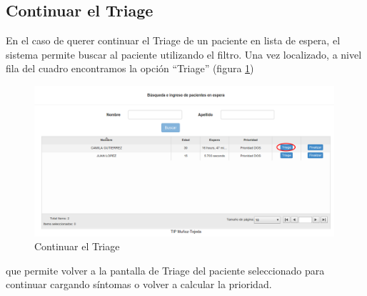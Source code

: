 \subsection{Continuar el Triage}
En el caso de querer continuar el Triage de un paciente en lista de espera, el sistema permite buscar al paciente utilizando el filtro. Una vez localizado, a nivel fila del cuadro encontramos la opción ``Triage'' (figura \ref{fig:espera1})
\begin{figure}
\centerline{\includegraphics[width=0.99\textwidth]{espera1.png}}
\caption{Continuar el Triage} \label{fig:espera1}
\end{figure}
que permite volver a la pantalla de Triage del paciente seleccionado para continuar cargando síntomas o volver a calcular la prioridad.

